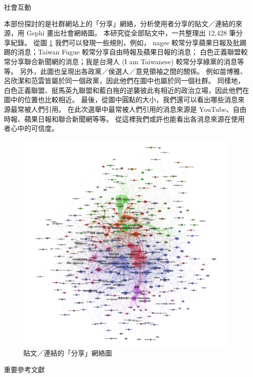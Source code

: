 \documentclass[final,hyperref={pdfpagelabels=false}]{beamer}
\begin{document}
\begin{CJK}{UTF8}{bsmi}
\begin{frame}
\begin{minipage}{0.68\textwidth}
\begin{block}{社會互動}
\begin{minipage}{0.50\textwidth}
  本部份探討的是社群網站上的「分享」網絡，分析使用者分享的貼文／連結的來源，用 Gephi 畫出社會網絡圖。%
  本研究從全部貼文中，一共整理出 12,428 筆分享紀錄。
  從圖 \ref{f4} 我們可以發現一些規則，例如，%
  nagee 較常分享蘋果日報及批踢踢的消息；Taiwan Fugue 較常分享自由時報及蘋果日報的消息；%
  白色正義聯盟較常分享聯合新聞網的消息；我是台灣人 (I am Taiwanese) 較常分享綠黨的消息等等。%
  另外，此圖也呈現出各政黨／侯選人／意見領袖之間的關係。%
  例如苗博雅、呂欣潔和范雲皆屬於同一個政黨，因此他們在圖中也屬於同一個社群。%
  同樣地，白色正義聯盟、挺馬英九聯盟和藍白拖的逆襲彼此有相近的政治立場，因此他們在圖中的位置也比較相近。%
  最後，從圖中圓點的大小，我們還可以看出哪些消息來源最常被人們引用。%
  在此次選舉中最常被人們引用的消息來源是 YouTube、自由時報、蘋果日報和聯合新聞網等等。%
  從這裡我們或許也能看出各消息來源在使用者心中的可信度。%
\end{minipage}
\quad
\begin{minipage}{0.43\textwidth}
  \begin{figure}[!htbp]
  \centering
  \includegraphics[width=\columnwidth]{sna_sm}
  \caption{貼文／連結的「分享」網絡圖}
  \label{f4}
  \end{figure}
\end{minipage}
\end{block}
\end{minipage}
\quad
\begin{minipage}{0.30\textwidth}
\begin{block}{重要參考文獻}
  \nocite{*}
  
    
\end{block}
\end{minipage}

\end{frame}
\end{CJK}
\end{document}
